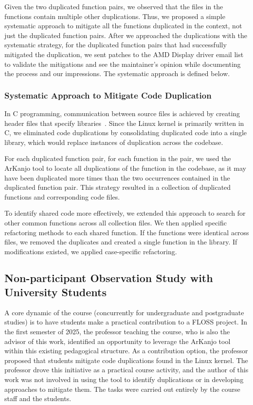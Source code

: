 Given the two duplicated function pairs, we observed that the files in the functions 
contain multiple other duplications. Thus, we proposed a simple systematic approach 
to mitigate all the functions duplicated in the context, not just the duplicated 
function pairs. 
After we approached the duplications with the systematic strategy, for the duplicated 
function pairs that had successfully mitigated the duplication, we sent patches to the 
AMD Display driver email list to validate the mitigations and see the maintainer's opinion 
while documenting the process and our impressions.
The systematic approach is defined below. 

\subsubsection{Systematic Approach to Mitigate Code Duplication}
\label{subsubsec:systematic}

In C programming, communication between source files is achieved by creating header files that specify 
libraries~\cite{Cbook}. Since the Linux kernel is primarily written in C, we eliminated code duplications by consolidating duplicated code into a single library, which would replace instances of 
duplication across the codebase.

For each duplicated function pair, for each function in the pair, we used the ArKanjo tool to locate all duplications of the function in the codebase, as it may have been duplicated more times than the two occurrences contained in the duplicated function pair. 
This strategy resulted in a collection of duplicated functions and corresponding code files.

To identify shared code more effectively, we extended this approach to search for other common 
functions across all collection files. We then applied specific refactoring methods to each shared 
function. If the functions were identical across files, we removed the duplicates and created a single 
function in the library. If modifications existed, we applied case-specific refactoring.

\subsection{Non-participant Observation Study with University Students}

A core dynamic of the course (concurrently for undergraduate and postgraduate studies) is to 
have students make a practical contribution to a FLOSS project. In the first semester of 
2025, the professor teaching the course, who is also the advisor of this work, identified an 
opportunity to leverage the ArKanjo tool within this existing pedagogical structure. 
As a contribution option, the professor proposed that students mitigate code duplications found 
in the Linux kernel. The professor drove this initiative as a practical course activity, 
and the author of this work was not involved in using the tool to identify duplications or 
in developing approaches to mitigate them. The tasks were carried out entirely by the course 
staff and the students.

